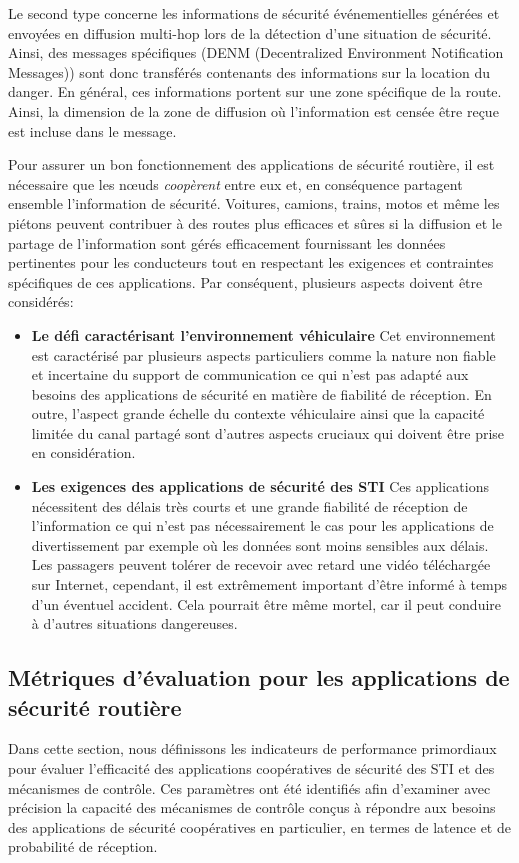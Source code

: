 Le second type concerne les informations de sécurité événementielles générées et envoyées en diffusion multi-hop lors de la détection d'une situation de sécurité. Ainsi, des messages spécifiques (DENM (Decentralized Environment Notification Messages)) sont donc transférés contenants des informations sur la location du danger. En général, ces informations portent sur une zone spécifique de la route. Ainsi, la dimension de la zone de diffusion où l'information est censée être reçue est incluse dans le message.

Pour assurer un bon fonctionnement des applications de sécurité routière, il est nécessaire que les nœuds \textit{coopèrent} entre eux et, en conséquence partagent ensemble l'information de sécurité. Voitures, camions, trains, motos et même les piétons peuvent contribuer à des routes plus efficaces et sûres si la diffusion et le partage de l'information sont gérés efficacement fournissant les données pertinentes pour les conducteurs tout en respectant les exigences et contraintes spécifiques de ces applications. Par conséquent, plusieurs aspects doivent être considérés:

\begin{itemize}
\item \textbf{Le défi caractérisant l'environnement véhiculaire}
Cet environnement est caractérisé par plusieurs aspects particuliers comme la nature non fiable et incertaine du support de communication ce qui n'est pas adapté aux besoins des applications de sécurité en matière de fiabilité de réception. En outre, l'aspect grande échelle du contexte véhiculaire ainsi que la capacité limitée du canal partagé sont d'autres aspects cruciaux qui doivent \^etre prise en considération.

\item \textbf{Les exigences des applications de sécurité des STI}
Ces applications nécessitent des délais très courts et une grande fiabilité de réception de l'information ce qui n'est pas nécessairement le cas pour les applications de divertissement par exemple où les données sont moins sensibles aux délais. Les passagers peuvent tolérer de recevoir avec retard une vidéo téléchargée sur Internet, cependant, il est extrêmement important d'être informé à temps d'un éventuel accident. Cela pourrait être même mortel, car il peut conduire à d'autres situations dangereuses.
\end{itemize}

\subsection{Métriques d'évaluation pour les applications de sécurité routière}
Dans cette section, nous définissons les indicateurs de performance primordiaux pour évaluer l'efficacité des applications coopératives de sécurité des STI et des mécanismes de contrôle. Ces paramètres ont été identifiés afin d'examiner avec précision la capacité des mécanismes de contrôle conçus à répondre aux besoins des applications de sécurité coopératives en particulier, en termes de latence et de probabilité de réception.

